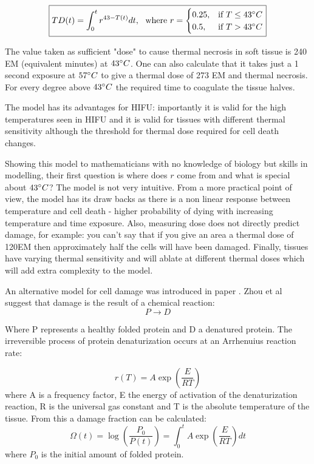 \documentclass[11pt]{article} %
\begin{document}
\begin{equation}
\boxed{TD(t)=\int_{0}^{t}r^{43-T(t)}dt,\ \ \text{where  } r=
\begin{cases}
0.25, & \text{if}\ T\leq 43 \degree C \\
0.5, & \text{if}\ T>43 \degree C 
\end{cases}}
\label{Sapereto}
\end{equation}
	
	The value taken as sufficient "dose" to cause thermal necrosis in soft tissue is 240 EM (equivalent minutes) at $43 \degree C $. One can also calculate that it takes just a 1 second exposure at $57 \degree C $ to give a thermal dose of 273 EM and thermal necrosis. For every degree above  $43 \degree C $ the required time to coagulate the tissue halves. 
	
	The model has its advantages for HIFU: importantly it is valid for the high temperatures seen in HIFU and it is valid for tissues with different thermal sensitivity although the threshold for thermal dose required for cell death changes. 
	
	Showing this model to mathematicians with no knowledge of biology but skills in modelling, their first question is where does $ r $ come from and what is special about $43 \degree C $? The model is not very intuitive. From a more practical point of view, the model has its draw backs as there is a non linear response between temperature and cell death - higher probability of dying with increasing temperature and time exposure. Also, measuring dose does not directly predict damage, for example: you can't say that if you give an area a thermal dose of 120EM then approximately half the cells will have been damaged. Finally, tissues have varying thermal sensitivity and will ablate at different thermal doses which will add extra complexity to the model.
	
		An alternative model for cell damage was introduced in  paper  \cite{Zhou2007}. Zhou et al suggest that damage is the result of a chemical reaction:
		\begin{equation}
		P\rightarrow D
		\end{equation}
		
		Where P represents a healthy folded protein and D a denatured protein. The irreversible process of protein denaturization occurs at an Arrhenuius reaction rate:
		
		\begin{equation}
			\boxed{r(T)=A\exp\left( \frac{E}{RT}\right) }
		\end{equation}	
		where A is a frequency factor, E the energy of activation of the denaturization reaction, R is the universal gas constant and T is the absolute temperature of the tissue. From this a damage fraction can be calculated:
		\begin{equation}
			\boxed{\Omega(t)=\log\left( \frac{P_0}{P(t)}\right) =\int_{0}^{t}A\exp\left( \frac{E}{RT}\right) dt}
		\end{equation}
		where $ P_0$ is the initial amount of folded protein.
		
\end{document}
